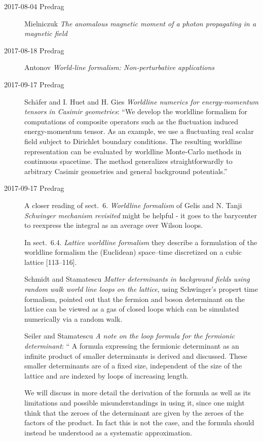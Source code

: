 \begin{description}
\item[2017-08-04 Predrag]
Mielniczuk \etal{}
{\em The anomalous magnetic moment of a photon propagating in a magnetic field}

\item[2017-08-18 Predrag]
Antonov
{\em World-line formalism: {Non-perturbative} applications}

\item[2017-09-17 Predrag]
Sch{\"a}fer and I. Huet and H. Gies
{\em Worldline numerics for energy-momentum tensors in {Casimir} geometries}:
``We develop the worldline formalism for computations of composite operators
such as the fluctuation induced energy-momentum tensor. As an example, we use
a fluctuating real scalar field subject to Dirichlet boundary conditions. The
resulting worldline representation can be evaluated by worldline Monte-Carlo
methods in continuous spacetime. The method generalizes straightforwardly
to arbitrary Casimir geometries and general background potentials.''


\item[2017-09-17 Predrag]
A closer reading of sect.~6. {\em Worldline formalism} of Gelis and N.
Tanji {\em Schwinger mechanism revisited} might be helpful - it
goes to the barycenter to reexpress the integral as an average over Wilson
loops.

In sect.~6.4. {\em Lattice worldline formalism} they describe a
formulation of the worldline formalism the (Euclidean) space–time
discretized on a cubic lattice  [113–116].

Schmidt and Stamatescu {\em Matter determinants in
background fields using random walk world line loops on the lattice},
using Schwinger's propert time formalism, pointed out that the fermion and
boson determinant on the lattice can be viewed as a gas of closed loops
which can be simulated numerically via a random walk.

Seiler and Stamatescu
{\em A note on the loop formula for the fermionic determinant}: ``
A formula expressing the fermionic determinant as an infinite product of
smaller determinants is derived and discussed. These smaller determinants are
of a fixed size, independent of the size of the lattice and are indexed by
loops of increasing length.

We will discuss in more detail the derivation of the formula as well as its
limitations and possible misunderstandings in using it, since one might think
that the zeroes of the determinant are given by the zeroes of the factors of
the product. In fact this is not the case, and the formula should instead be
understood as a systematic approximation.


\end{description}
